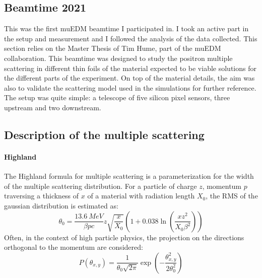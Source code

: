 \begin{refsection}
\section{Beamtime 2021}
\label{sec:muEDM:tim}
    This was the first muEDM beamtime I participated in. 
    I took an active part in the setup and measurement and I followed the analysis of the data collected. 
    This section relies on the Master Thesis of Tim Hume, part of the muEDM collaboration.
    This beamtime was designed to study the positron multiple scattering in different thin foils of the material expected to be viable solutions for the different parts of the experiment.
    On top of the material details, the aim was also to validate the scattering model used in the \gf simulations for further reference.
    The setup was quite simple: a telescope of five silicon pixel sensors,  three upstream and two downstream.

    \subsection{Description of the multiple scattering}
        \paragraph{Highland}
        The Highland formula for multiple scattering is a parameterization for the width of the multiple scattering distribution.
        For a particle of charge $z$, momentum $p$ traversing a thickness of $x$ of a material with radiation length $X_0$, the RMS of the gaussian distribution is estimated as:
        \begin{equation}
        \label{eq:highland}
        \theta_0 = \frac{\SI{13.6}{MeV}}{\beta p c} z \sqrt{\frac{x}{X_0}} \left(1 + 0.038 \ln( \frac{x z^2}{X_0 \beta^2}) \right)
        \end{equation}
        Often, in the context of high particle physics, the projection on the directions orthogonal to the momentum are considered:
        \begin{equation}
        P(\theta_{x,y}) = \frac{1}{{\theta_0 \sqrt{2\pi}}} \exp\left(-\frac{\theta_{x,y}^2}{2\theta_0^2}\right)
        \end{equation}


\end{refsection}
